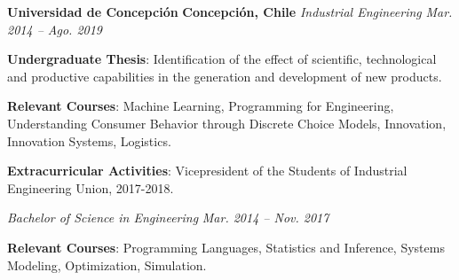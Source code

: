 \item
\headerrow
{\textbf{Universidad de Concepción}}
{\textbf{Concepción, Chile}}
\headerrow
{\emph{Industrial Engineering}}
{\emph{Mar. 2014 -- Ago. 2019}}
\begin{itemize*}
    \item \textbf{Undergraduate Thesis}: Identification of the effect of scientific, 
    technological and productive capabilities in the generation and development of 
    new products.
    \item \textbf{Relevant Courses}: Machine Learning, Programming for Engineering, 
    Understanding Consumer Behavior through Discrete Choice Models, Innovation, 
    Innovation Systems, Logistics.
    \item \textbf{Extracurricular Activities}: Vicepresident of the Students of Industrial
    Engineering Union, 2017-2018.
\end{itemize*}
\headerrow
{\emph{Bachelor of Science in Engineering}}
{\emph{Mar. 2014 -- Nov. 2017}}
\begin{itemize*}
    \item \textbf{Relevant Courses}: Programming Languages, Statistics and
    Inference, Systems Modeling, Optimization, Simulation.
\end{itemize*}